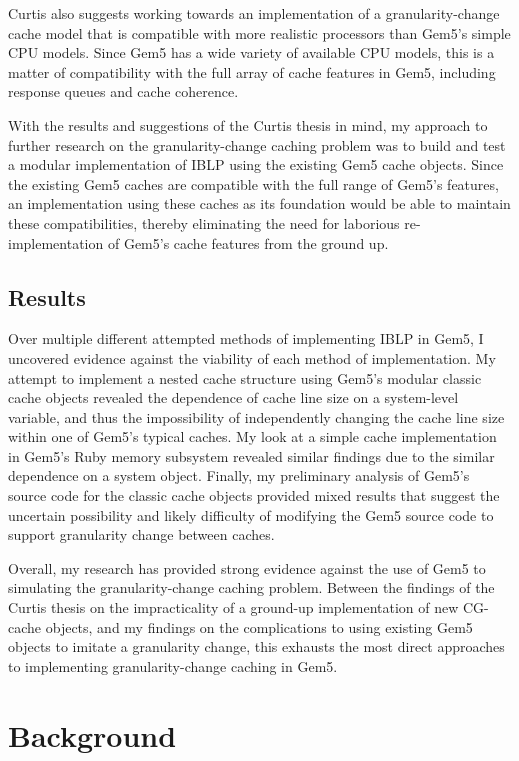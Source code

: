\documentclass[12pt,twoside]{reedthesis}
\begin{document}
	Curtis also suggests working towards an implementation of a granularity-change cache model that is compatible with more realistic processors than Gem5's simple CPU models. Since Gem5 has a wide variety of available CPU models, this is a matter of compatibility with the full array of cache features in Gem5, including response queues and cache coherence.

	With the results and suggestions of the Curtis thesis in mind, my approach to further research on the granularity-change caching problem was to build and test a modular implementation of IBLP using the existing Gem5 cache objects. Since the existing Gem5 caches are compatible with the full range of Gem5's features, an implementation using these caches as its foundation would be able to maintain these compatibilities, thereby eliminating the need for laborious re-implementation of Gem5's cache features from the ground up.

\section{Results}

Over multiple different attempted methods of implementing IBLP in Gem5, I uncovered evidence against the viability of each method of implementation. My attempt to implement a nested cache structure using Gem5's modular classic cache objects revealed the dependence of cache line size on a system-level variable, and thus the impossibility of independently changing the cache line size within one of Gem5's typical caches. My look at a simple cache implementation in Gem5's Ruby memory subsystem revealed similar findings due to the similar dependence on a system object. Finally, my preliminary analysis of Gem5's source code for the classic cache objects provided mixed results that suggest the uncertain possibility and likely difficulty of modifying the Gem5 source code to support granularity change between caches.

Overall, my research has provided strong evidence against the use of Gem5 to simulating the granularity-change caching problem. Between the findings of the Curtis thesis on the impracticality of a ground-up implementation of new CG-cache objects, and my findings on the complications to using existing Gem5 objects to imitate a granularity change, this exhausts the most direct approaches to implementing granularity-change caching in Gem5.


\chapter{Background}
\end{document}
